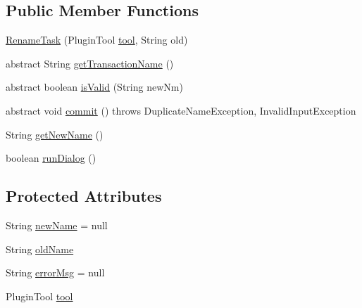\subsection*{Public Member Functions}
\begin{DoxyCompactItemize}
\item 
\mbox{\hyperlink{classghidra_1_1app_1_1plugin_1_1core_1_1decompile_1_1actions_1_1_rename_task_a6f6f3dfe409bcc28199c20796b17004c}{Rename\+Task}} (Plugin\+Tool \mbox{\hyperlink{classghidra_1_1app_1_1plugin_1_1core_1_1decompile_1_1actions_1_1_rename_task_aded3c0474f9fa5697b5b550bc2709597}{tool}}, String old)
\item 
abstract String \mbox{\hyperlink{classghidra_1_1app_1_1plugin_1_1core_1_1decompile_1_1actions_1_1_rename_task_a604b0ade1197411f4f3e896dffeff3d6}{get\+Transaction\+Name}} ()
\item 
abstract boolean \mbox{\hyperlink{classghidra_1_1app_1_1plugin_1_1core_1_1decompile_1_1actions_1_1_rename_task_aaf101a54f5b25d5e37996bc7008abfc5}{is\+Valid}} (String new\+Nm)
\item 
abstract void \mbox{\hyperlink{classghidra_1_1app_1_1plugin_1_1core_1_1decompile_1_1actions_1_1_rename_task_a99f91949abe47258c840d2c025e845c3}{commit}} ()  throws Duplicate\+Name\+Exception, Invalid\+Input\+Exception
\item 
String \mbox{\hyperlink{classghidra_1_1app_1_1plugin_1_1core_1_1decompile_1_1actions_1_1_rename_task_a01e2302182950a0bac21cd8409aaab64}{get\+New\+Name}} ()
\item 
boolean \mbox{\hyperlink{classghidra_1_1app_1_1plugin_1_1core_1_1decompile_1_1actions_1_1_rename_task_a871de7fef6150006478b2b3a8f56ec15}{run\+Dialog}} ()
\end{DoxyCompactItemize}
\subsection*{Protected Attributes}
\begin{DoxyCompactItemize}
\item 
String \mbox{\hyperlink{classghidra_1_1app_1_1plugin_1_1core_1_1decompile_1_1actions_1_1_rename_task_abd8ba546b7598a64f2fa8b7f0fd1255d}{new\+Name}} = null
\item 
String \mbox{\hyperlink{classghidra_1_1app_1_1plugin_1_1core_1_1decompile_1_1actions_1_1_rename_task_ae01f8e08d5db77bcbce9b69420803f5f}{old\+Name}}
\item 
String \mbox{\hyperlink{classghidra_1_1app_1_1plugin_1_1core_1_1decompile_1_1actions_1_1_rename_task_a710874a0fe2e4c9c1a218ea20af426aa}{error\+Msg}} = null
\item 
Plugin\+Tool \mbox{\hyperlink{classghidra_1_1app_1_1plugin_1_1core_1_1decompile_1_1actions_1_1_rename_task_aded3c0474f9fa5697b5b550bc2709597}{tool}}
\end{DoxyCompactItemize}


